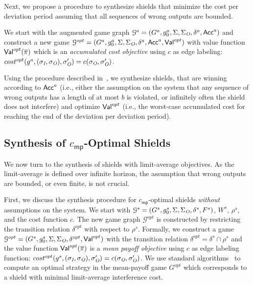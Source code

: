 Next, we propose a procedure to synthesize shields that minimize the cost per deviation period assuming  that
all sequences of wrong outputs are bounded.

We start with the augmented game graph $\mathcal G^{a} = (G^{a}, g_0^{a},\Sigma,\Sigma_{\textit{O}},\delta^{a},\mathsf{Acc}^{a})$ and  construct a new game $\mathcal G^{opt} = (G^{a}, g_0^{a},\Sigma,\Sigma_{\textit{O}},\delta^{a},\mathsf{Acc}^{a},\mathsf{Val}^{opt})$
with value function $\mathsf{Val}^{opt}(\overline{\pi})$ which is an \emph{accumulated cost objective} using $c$ as edge labeling: $cost^{opt}(g^{a},(\sigma_{\textit{I}},\sigma_{\textit{O}}),\sigma_{\textit{O}}') = c(\sigma_{\textit{O}},\sigma_{\textit{O}}')$.

Using the  procedure described in~\cite{jing2013}, we synthesize shields, that are winning according to $\mathsf{Acc}^{a}$
(i.e., either the assumption on the system that any sequence of wrong outputs has a length of at most $b$ is violated,
or infinitely often the shield does not interfere)
and optimize $\mathsf{Val}^{opt}$ (i.e., the worst-case accumulated cost for reaching the end of the deviation per deviation period).

\iffalse
\subsection{Synthesis of $c_{\mathsf{mp}}$-Optimal Shields}
We now turn to the synthesis of shields with limit-average objectives. As the limit-average is defined over infinite horizon, the assumption that wrong outputs are bounded, or even finite, is not crucial.

First, we discuss the synthesis procedure for $c_{\mathsf{mp}}$-optimal shields \emph{without} assumptions on the system.
We start with $\mathcal G^s = (G^s, g_0^s,\Sigma,\Sigma_{\textit{O}},\delta^s,F^s)$, $W^s$, $\rho^s$, and the cost function $c$.
The new game graph $\mathcal G^{opt}$ is constructed by  restricting the
transition relation $\delta^{opt}$ with respect to $\rho^s$.
Formally, we construct a game $\mathcal G^{opt} = (G^s, g_0^s,\Sigma,\Sigma_{\textit{O}},\delta^{opt}, \mathsf{Val}^{opt})$ with
the transition relation $\delta^{opt} = \delta^s \cap \rho^s$
and the value function
$\mathsf{Val}^{opt}(\overline{\pi})$ is a \emph{mean payoff objective} using $c$ as edge labeling function:
$cost^{opt}(g^{s},(\sigma_{\textit{I}},\sigma_{\textit{O}}),\sigma_{\textit{O}}') = c(\sigma_{\textit{O}},\sigma_{\textit{O}}')$.
We use standard algorithms~\cite{ZwickP96} to compute an optimal strategy in the mean-payoff game $G^{opt}$ which corresponds to a shield with minimal limit-average interference cost.


